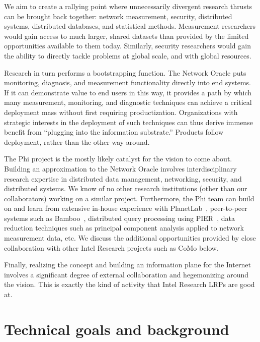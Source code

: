 \documentclass[twocolumn,10pt]{article}
\def\Sys{Network Oracle\xspace}
\def\Lrp{Phi\xspace}
\begin{document}
We aim to create a rallying point where
unnecessarily divergent research thrusts 
can be brought back together: network measurement,
security, distributed systems, distributed databases, and statistical
methods.  Measurement
researchers would gain access to much larger, shared datasets
than provided by the limited opportunities available to them today.
Similarly, security researchers would gain the ability to directly
tackle problems at global scale, and with global resources. 

Research in turn performs a bootstrapping function.
The \Sys puts monitoring, diagnosis, and measurement
functionality directly into end systems.  If it can demonstrate
value to end users in this way, it provides a path by which many
measurement, monitoring, and diagnostic techniques can achieve a
critical deployment mass without first requiring productization.
Organizations with strategic interests in the deployment of such
techniques can thus derive immense benefit from ``plugging into
the information substrate.'' Products follow deployment, rather
than the other way around.

The \Lrp project is the mostly likely catalyst for the vision to come
about.  Building an approximation to the \Sys involves
interdisciplinary research expertise in distributed data management,
networking, security, and distributed systems.  We know of no other
research institutions (other than our collaborators) working on a
similar project.  Furthermore,
the \Lrp team can build on and learn from extensive in-house
experience with PlanetLab~\cite{planetlab:hotnets}, peer-to-peer
systems such as 
Bamboo~\cite{rhea_usenix_2004}, distributed query processing using
PIER~\cite{huebsch_vldb03}, data reduction techniques such as
principal component analysis applied to network measurement
data, etc.  We discuss the additional opportunities
provided by close collaboration with other Intel Research projects
such as CoMo below. 

Finally, realizing the concept and building an information plane
for the Internet involves a significant degree of external
collaboration and hegemonizing around the vision.  This is exactly the
kind of activity that Intel Research LRPs are good at. 

\section{Technical goals and background}
\end{document}
